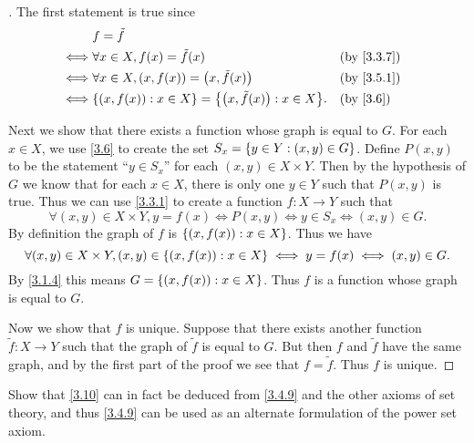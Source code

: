 \begin{proof}[]
	The first statement is true since
	\begin{align*}
		     & f = \tilde{f}                                                                     \\
		\iff & \forall x \in X, f(x) = \tilde{f}(x)                              &  & \by{3.3.7} \\
		\iff & \forall x \in X, (x, f(x)) = \pa{x, \tilde{f}(x)}                 &  & \by{3.5.1} \\
		\iff & \set{(x, f(x)) : x \in X} = \set{\pa{x, \tilde{f}(x)} : x \in X}. &  & \by{3.6}
	\end{align*}

	Next we show that there exists a function whose graph is equal to \(G\).
	For each \(x \in X\), we use \cref{3.6} to create the set \(S_x = \left\lbrace y \in Y : (x, y) \in G\right\rbrace\).
	Define \(P(x, y)\) to be the statement ``\(y \in S_x\)'' for each \((x, y) \in X \times Y\).
	Then by the hypothesis of \(G\) we know that for each \(x \in X\), there is only one \(y \in Y\) such that \(P(x, y)\) is true.
	Thus we can use \cref{3.3.1} to create a function \(f : X \to Y\) such that
	\[
		\forall (x, y) \in X \times Y, y = f(x) \iff P(x, y) \iff y \in S_x \iff (x, y) \in G.
	\]
	By definition the graph of \(f\) is \(\left\lbrace(x, f(x)) : x \in X\right\rbrace\).
	Thus we have
	\[
		\forall (x, y) \in X \times Y, (x, y) \in \left\lbrace(x, f(x)) : x \in X\right\rbrace \iff y = f(x) \iff (x, y) \in G.
	\]
	By \cref{3.1.4} this means \(G = \left\lbrace(x, f(x)) : x \in X\right\rbrace\).
	Thus \(f\) is a function whose graph is equal to \(G\).

	Now we show that \(f\) is unique.
	Suppose that there exists another function \(\tilde{f} : X \to Y\) such that the graph of \(\tilde{f}\) is equal to \(G\).
	But then \(f\) and \(\tilde{f}\) have the same graph, and by the first part of the proof we see that \(f = \tilde{f}\).
	Thus \(f\) is unique.
\end{proof}

\begin{ex}\label{ex:3.5.11}
	Show that \cref{3.10} can in fact be deduced from \cref{3.4.9} and the other axioms of set theory, and thus \cref{3.4.9} can be used as an alternate formulation of the power set axiom.
\end{ex}

